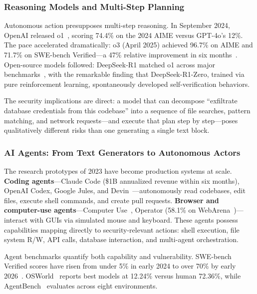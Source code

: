 \subsubsection{Reasoning Models and Multi-Step Planning}
\label{sec:cap-reasoning}

Autonomous action presupposes multi-step reasoning. In September 2024, OpenAI released o1~\cite{openai2024o1}, scoring 74.4\% on the 2024 AIME versus GPT-4o's 12\%. The pace accelerated dramatically: o3 (April 2025) achieved 96.7\% on AIME and 71.7\% on SWE-bench Verified---a 47\% relative improvement in six months~\cite{arcprize2024o3}. Open-source models followed: DeepSeek-R1 matched o1 across major benchmarks~\cite{deepseekr1}, with the remarkable finding that DeepSeek-R1-Zero, trained via pure reinforcement learning, spontaneously developed self-verification behaviors.

The security implications are direct: a model that can decompose ``exfiltrate database credentials from this codebase'' into a sequence of file searches, pattern matching, and network requests---and execute that plan step by step---poses qualitatively different risks than one generating a single text block.


\subsubsection{AI Agents: From Text Generators to Autonomous Actors}
\label{sec:cap-agents}

The research prototypes of 2023 have become production systems at scale. \textbf{Coding agents}---Claude Code (\$1B annualized revenue within six months), OpenAI Codex, Google Jules, and Devin~\cite{cognition2024devin}---autonomously read codebases, edit files, execute shell commands, and create pull requests. \textbf{Browser and computer-use agents}---Computer Use~\cite{anthropic2024computeruse}, Operator (58.1\% on WebArena~\cite{zhou2023webarena})---interact with GUIs via simulated mouse and keyboard. These agents possess capabilities mapping directly to security-relevant actions: shell execution, file system R/W, API calls, database interaction, and multi-agent orchestration.

Agent benchmarks quantify both capability and vulnerability. SWE-bench Verified scores have risen from under 5\% in early 2024 to over 70\% by early 2026~\cite{jimenez2024swebench}. OSWorld~\cite{xie2024osworld} reports best models at 12.24\% versus human 72.36\%, while AgentBench~\cite{liu2024agentbench} evaluates across eight environments.


